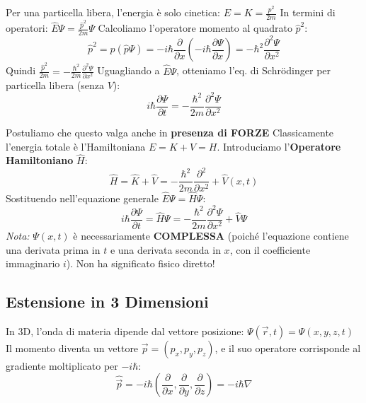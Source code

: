 \documentclass[11pt, a4paper]{article}
\begin{document}
Per una particella libera, l'energia è solo cinetica: $E = K = \frac{p^2}{2m}$ %
In termini di operatori: $\hat{E}\Psi = \frac{\hat{p}^2}{2m}\Psi$ %
Calcoliamo l'operatore momento al quadrato $\hat{p}^2$: %
\begin{equation*}
    \hat{p}^2 = \hat{p}(\hat{p}\Psi) = -i\hbar \frac{\partial}{\partial x} \left( -i\hbar \frac{\partial \Psi}{\partial x} \right) = -\hbar^2 \frac{\partial^2 \Psi}{\partial x^2} %
\end{equation*}
Quindi $\frac{\hat{p}^2}{2m} = -\frac{\hbar^2}{2m} \frac{\partial^2 \Psi}{\partial x^2}$ %
Uguagliando a $\hat{E}\Psi$, otteniamo l'eq. di Schrödinger per particella libera (senza $V$): %
\begin{equation}
    i\hbar \frac{\partial \Psi}{\partial t} = -\frac{\hbar^2}{2m} \frac{\partial^2 \Psi}{\partial x^2} %
\end{equation}

\noindent
Postuliamo che questo valga anche in \textbf{presenza di FORZE} %
Classicamente l'energia totale è l'Hamiltoniana $E = K + V = H$. %
Introduciamo l'\textbf{Operatore Hamiltoniano} $\hat{H}$: %
\begin{equation*}
    \hat{H} = \hat{K} + \hat{V} = -\frac{\hbar^2}{2m} \frac{\partial^2}{\partial x^2} + \hat{V}(x,t) %
\end{equation*}
Sostituendo nell'equazione generale $\hat{E}\Psi = \hat{H}\Psi$: %
\begin{equation}
    i\hbar \frac{\partial \Psi}{\partial t} = \hat{H}\Psi = -\frac{\hbar^2}{2m} \frac{\partial^2 \Psi}{\partial x^2} + \hat{V}\Psi %
\end{equation}
\textit{Nota:} $\Psi(x,t)$ è necessariamente \textbf{COMPLESSA} (poiché l'equazione contiene una derivata prima in $t$ e una derivata seconda in $x$, con il coefficiente immaginario $i$). Non ha significato fisico diretto! %

\subsection{Estensione in 3 Dimensioni} %

In 3D, l'onda di materia dipende dal vettore posizione: $\Psi(\vec{r},t) = \Psi(x,y,z,t)$ %
Il momento diventa un vettore $\vec{p} = (p_x, p_y, p_z)$, e il suo operatore corrisponde al gradiente moltiplicato per $-i\hbar$: %
\begin{equation*}
    \hat{\vec{p}} = -i\hbar \left( \frac{\partial}{\partial x}, \frac{\partial}{\partial y}, \frac{\partial}{\partial z} \right) = -i\hbar \nabla %
\end{equation*}
\end{document}
